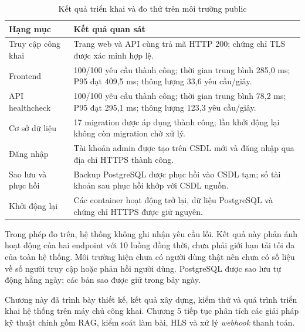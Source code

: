 \documentclass[../DoAn.tex]{subfiles}
\begin{document}
\begin{table}[H]
\centering
\caption{Kết quả triển khai và đo thử trên môi trường public}
\label{tab:production_deployment_verification}
\small
\renewcommand{\arraystretch}{1.3}
\setlength{\tabcolsep}{5pt}
\begin{tabular}{|p{4.0cm}|p{8.6cm}|}
\hline
\textbf{Hạng mục} & \textbf{Kết quả quan sát} \\ \hline
Truy cập công khai & Trang web và API cùng trả mã HTTP 200; chứng chỉ TLS được xác minh hợp lệ. \\ \hline
Frontend & 100/100 yêu cầu thành công; thời gian trung bình 285,0 ms; P95 đạt 409,5 ms; thông lượng 33,6 yêu cầu/giây. \\ \hline
API healthcheck & 100/100 yêu cầu thành công; thời gian trung bình 78,2 ms; P95 đạt 295,1 ms; thông lượng 123,3 yêu cầu/giây. \\ \hline
Cơ sở dữ liệu & 17 migration được áp dụng thành công; lần khởi động lại không còn migration chờ xử lý. \\ \hline
Đăng nhập & Tài khoản admin được tạo trên CSDL mới và đăng nhập qua địa chỉ HTTPS thành công. \\ \hline
Sao lưu và phục hồi & Backup PostgreSQL được phục hồi vào CSDL tạm; số tài khoản sau phục hồi khớp với CSDL nguồn. \\ \hline
Khởi động lại & Các container hoạt động trở lại, dữ liệu PostgreSQL và chứng chỉ HTTPS được giữ nguyên. \\ \hline
\end{tabular}
\end{table}

Trong phép đo trên, hệ thống không ghi nhận yêu cầu lỗi. Kết quả này phản ánh hoạt động của hai endpoint với 10 luồng đồng thời, chưa phải giới hạn tải tối đa của toàn hệ thống. Môi trường hiện chưa có người dùng thật nên chưa có số liệu về số người truy cập hoặc phản hồi người dùng. PostgreSQL được sao lưu tự động hằng ngày; các bản sao được giữ trong bảy ngày.

Chương này đã trình bày thiết kế, kết quả xây dựng, kiểm thử và quá trình triển khai hệ thống trên máy chủ công khai. Chương 5 tiếp tục phân tích các giải pháp kỹ thuật chính gồm RAG, kiểm soát làm bài, HLS và xử lý \textit{webhook} thanh toán.
\end{document}
